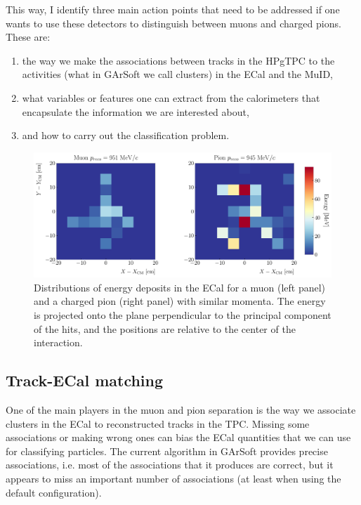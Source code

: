 This way, I identify three main action points that need to be addressed if one wants to use these detectors to distinguish between muons and charged pions. These are:
\begin{enumerate}
	\item the way we make the associations between tracks in the HPgTPC to the activities (what in GArSoft we call clusters) in the ECal and the MuID,
	\item what variables or features one can extract from the calorimeters that encapsulate the information we are interested about,
	\item and how to carry out the classification problem.
\end{enumerate}

\begin{figure}[t]
	\centering
	\includegraphics[width=.95\linewidth]{Images/GArSoft_PID/BDT/ecal_energy_distribution_example.pdf}
	\caption[Distributions of energy deposits in the ECal for a muon and a charged pion with similar momenta.]{Distributions of energy deposits in the ECal for a muon (left panel) and a charged pion (right panel) with similar momenta. The energy is projected onto the plane perpendicular to the principal component of the hits, and the positions are relative to the center of the interaction.}
	\label{fig:ecal_example}
\end{figure}

\subsection{Track-ECal matching}

One of the main players in the muon and pion separation is the way we associate clusters in the ECal to reconstructed tracks in the TPC. Missing some associations or making wrong ones can bias the ECal quantities that we can use for classifying particles. The current algorithm in GArSoft provides precise associations, i.e. most of the associations that it produces are correct, but it appears to miss an important number of associations (at least when using the default configuration).

